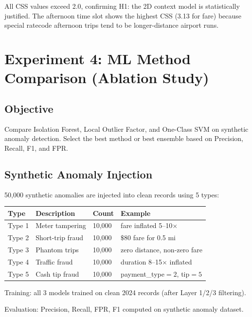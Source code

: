 All CSS values exceed 2.0, confirming H1: the 2D context model is statistically justified. The afternoon time slot shows the highest CSS (3.13 for fare) because special ratecode afternoon trips tend to be longer-distance airport runs.

\section{Experiment 4: ML Method Comparison (Ablation Study)}

\subsection{Objective}

Compare Isolation Forest, Local Outlier Factor, and One-Class SVM on synthetic anomaly detection. Select the best method or best ensemble based on Precision, Recall, F1, and FPR.

\subsection{Synthetic Anomaly Injection}

50,000 synthetic anomalies are injected into clean records using 5 types:

\begin{longtable}{|m{4cm}|m{4cm}|m{3.5cm}|m{2cm}|}
\hline
\textbf{Type} & \textbf{Description} & \textbf{Count} & \textbf{Example} \\ \hline
Type 1 & Meter tampering & 10,000 & fare inflated 5--10$\times$ \\ \hline
Type 2 & Short-trip fraud & 10,000 & $\$80$ fare for 0.5 mi \\ \hline
Type 3 & Phantom trips & 10,000 & zero distance, non-zero fare \\ \hline
Type 4 & Traffic fraud & 10,000 & duration 8--15$\times$ inflated \\ \hline
Type 5 & Cash tip fraud & 10,000 & payment\_type$=2$, tip$=5$ \\ \hline
\end{longtable}

Training: all 3 models trained on clean 2024 records (after Layer 1/2/3 filtering).

Evaluation: Precision, Recall, FPR, F1 computed on synthetic anomaly dataset.

